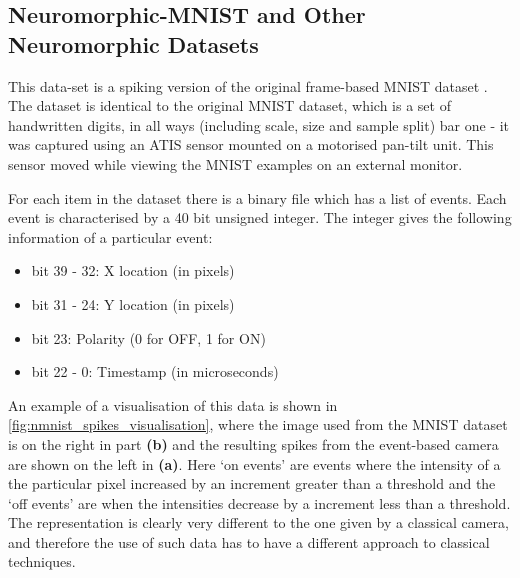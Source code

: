\subsection{Neuromorphic-MNIST and Other Neuromorphic Datasets} \label{ssec:neuromorphic_datasets}

This data-set is a spiking version of the original frame-based MNIST dataset \cite{MNIST}\cite{NMNIST}. The dataset is identical to the original MNIST dataset, which is a set of handwritten digits, in all ways (including scale, size and sample split) bar one - it was captured using an ATIS sensor mounted on a motorised pan-tilt unit. This sensor moved while viewing the MNIST examples on an external monitor.

For each item in the dataset there is a binary file which has a list of events. Each event is characterised by a 40 bit unsigned integer. The integer gives the following information of a particular event:

\begin{itemize}
      \item bit 39 - 32: X location (in pixels)
      \item bit 31 - 24: Y location (in pixels)
      \item bit 23: Polarity (0 for OFF, 1 for ON)
      \item bit 22 - 0: Timestamp (in microseconds)
\end{itemize}

An example of a visualisation of this data is shown in \autoref{fig:nmnist_spikes_visualisation}, where the image used from the MNIST dataset is on the right in part \textbf{(b)} and the resulting spikes from the event-based camera are shown on the left in \textbf{(a)}. Here `on events' are events where the intensity of a the particular pixel increased by an increment greater than a threshold and the `off events' are when the intensities decrease by a increment less than a threshold. The representation is clearly very different to the one given by a classical camera, and therefore the use of such data has to have a different approach to classical techniques.


